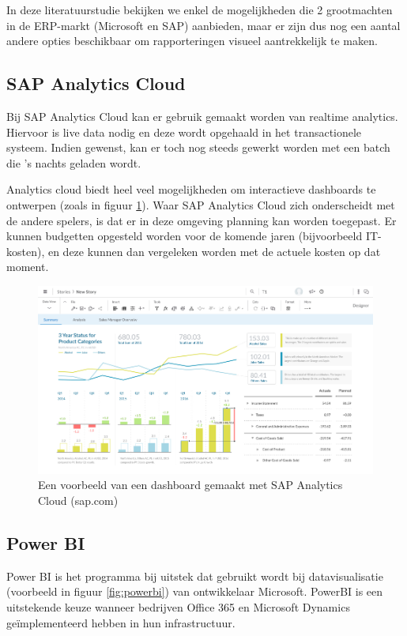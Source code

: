 In deze literatuurstudie bekijken we enkel de mogelijkheden die 2 grootmachten in de ERP-markt (Microsoft en SAP) aanbieden, maar er zijn dus nog een aantal andere opties beschikbaar om rapporteringen visueel aantrekkelijk te maken. 

\subsection{SAP Analytics Cloud}
Bij SAP Analytics Cloud kan er gebruik gemaakt worden van realtime analytics. Hiervoor is live data nodig en deze wordt opgehaald in het transactionele systeem. Indien gewenst, kan er toch nog steeds gewerkt worden met een batch die 's nachts geladen wordt. 

Analytics cloud biedt heel veel mogelijkheden om interactieve dashboards te ontwerpen (zoals in figuur \ref{fig:sac}). Waar SAP Analytics Cloud zich onderscheidt met de andere spelers, is dat er in deze omgeving planning kan worden toegepast. Er kunnen budgetten opgesteld worden voor de komende jaren (bijvoorbeeld IT-kosten), en deze kunnen dan vergeleken worden met de actuele kosten op dat moment. 

\begin{figure}[h]
	\centering
	\includegraphics[scale=0.45]{../images/sac.png}
	\caption{Een voorbeeld van een dashboard gemaakt met SAP Analytics Cloud (sap.com)}
	\label{fig:sac}
\end{figure}

\subsection{Power BI}
Power BI is het programma bij uitstek dat gebruikt wordt bij datavisualisatie (voorbeeld in figuur \ref{fig:powerbi}) van ontwikkelaar Microsoft. PowerBI is een uitstekende keuze wanneer bedrijven Office 365 en Microsoft Dynamics geïmplementeerd hebben in hun infrastructuur.

